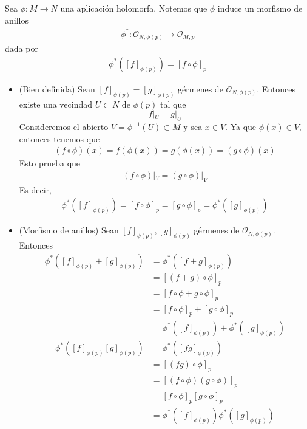 	\iffalse
	\begin{remark}
		Sea $\phi:M\to N$ una aplicación holomorfa. Notemos que $\phi$ induce un morfismo de anillos
		\begin{align*}
			\phi^*:\mathscr{O}_{N,\phi(p)}\longrightarrow \mathscr{O}_{M,p}
		\end{align*}
		dada por
		\begin{align*}
			\phi^*([f]_{\phi(p)})=[f\circ \phi]_p
		\end{align*}
		\begin{center}
		\end{center}
		\begin{itemize}
			\item (Bien definida) Sean $[f]_{\phi(p)}=[g]_{\phi(p)}$ gérmenes de $\mathscr{O}_{N,\phi(p)}$. Entonces existe una vecindad $U\subset N$ de $\phi(p)$ tal que
			\begin{equation*}
				f|_U=g|_U
			\end{equation*}
			Consideremos el abierto $V=\phi^{-1}(U)\subset M$ y sea $x\in V$. Ya que $\phi(x)\in V$, entonces tenemos que
			\begin{align*}
				(f\circ \phi)(x)=f(\phi(x))=g(\phi(x))=(g\circ \phi)(x)
			\end{align*}
			Esto prueba que 
			\begin{align*}
				(f\circ \phi)|_V=(g\circ \phi)|_V
			\end{align*} 
			Es decir,
			\begin{align*}
				\phi^*([f]_{\phi(p)})=[f\circ \phi]_p=[g\circ \phi]_p=\phi^*([g]_{\phi(p)})
			\end{align*}
		
			\item (Morfismo de anillos) Sean $[f]_{\phi(p)},[g]_{\phi(p)}$ gérmenes de $\mathscr{O}_{N,\phi(p)}$. Entonces
			\begin{align*}
				\phi^*([f]_{\phi(p)}+[g]_{\phi(p)})&=	\phi^*([f+g]_{\phi(p)})\\
				&=[(f+g)\circ \phi]_p\\
				&=[f\circ \phi+ g\circ \phi]_p\\
				&=[f\circ \phi]_p+[g\circ \phi]_p\\
				&=\phi^*([f]_{\phi(p)})+\phi^*([g]_{\phi(p)})
			\end{align*}
			\begin{align*}
				\phi^*([f]_{\phi(p)}[g]_{\phi(p)})&=		\phi^*([fg]_{\phi(p)})\\
				&=[(fg)\circ \phi]_p\\
				&=[(f\circ \phi) (g\circ \phi)]_p\\
				&=[f\circ \phi]_p[g\circ \phi]_p\\
				&=\phi^*([f]_{\phi(p)})\phi^*([g]_{\phi(p)})
			\end{align*}
		\end{itemize}
	\end{remark}
